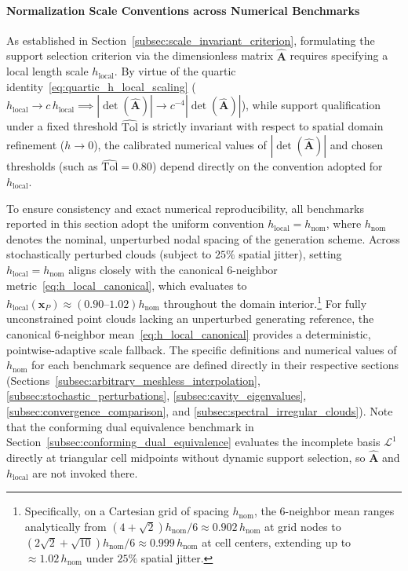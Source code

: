 \documentclass[preprint,12pt]{elsarticle}
\begin{document}
\paragraph{Normalization Scale Conventions across Numerical Benchmarks}
As established in Section~\ref{subsec:scale_invariant_criterion}, formulating the support selection criterion via the dimensionless matrix $\widehat{\mathbf{A}}$ requires specifying a local length scale $h_{\mathrm{local}}$. By virtue of the quartic identity~\eqref{eq:quartic_h_local_scaling} ($h_{\mathrm{local}} \to c \, h_{\mathrm{local}} \implies |\det(\widehat{\mathbf{A}})| \to c^{-4} |\det(\widehat{\mathbf{A}})|$), while support qualification under a fixed threshold $\widehat{\mathrm{Tol}}$ is strictly invariant with respect to spatial domain refinement ($h \to 0$), the calibrated numerical values of $|\det(\widehat{\mathbf{A}})|$ and chosen thresholds (such as $\widehat{\mathrm{Tol}} = 0.80$) depend directly on the convention adopted for $h_{\mathrm{local}}$.

To ensure consistency and exact numerical reproducibility, all benchmarks reported in this section adopt the uniform convention $h_{\mathrm{local}} = h_{\mathrm{nom}}$, where $h_{\mathrm{nom}}$ denotes the nominal, unperturbed nodal spacing of the generation scheme. Across stochastically perturbed clouds (subject to $25\%$ spatial jitter), setting $h_{\mathrm{local}} = h_{\mathrm{nom}}$ aligns closely with the canonical 6-neighbor metric~\eqref{eq:h_local_canonical}, which evaluates to $h_{\mathrm{local}}(\mathbf{x}_P) \approx (0.90\text{--}1.02) h_{\mathrm{nom}}$ throughout the domain interior.\footnote{Specifically, on a Cartesian grid of spacing $h_{\mathrm{nom}}$, the 6-neighbor mean ranges analytically from $(4 + \sqrt{2})h_{\mathrm{nom}}/6 \approx 0.902\,h_{\mathrm{nom}}$ at grid nodes to $(2\sqrt{2} + \sqrt{10})h_{\mathrm{nom}}/6 \approx 0.999\,h_{\mathrm{nom}}$ at cell centers, extending up to $\approx 1.02\,h_{\mathrm{nom}}$ under $25\%$ spatial jitter.} For fully unconstrained point clouds lacking an unperturbed generating reference, the canonical 6-neighbor mean~\eqref{eq:h_local_canonical} provides a deterministic, pointwise-adaptive scale fallback. The specific definitions and numerical values of $h_{\mathrm{nom}}$ for each benchmark sequence are defined directly in their respective sections (Sections~\ref{subsec:arbitrary_meshless_interpolation}, \ref{subsec:stochastic_perturbations}, \ref{subsec:cavity_eigenvalues}, \ref{subsec:convergence_comparison}, and \ref{subsec:spectral_irregular_clouds}). Note that the conforming dual equivalence benchmark in Section~\ref{subsec:conforming_dual_equivalence} evaluates the incomplete basis $\mathcal{L}^1$ directly at triangular cell midpoints without dynamic support selection, so $\widehat{\mathbf{A}}$ and $h_{\mathrm{local}}$ are not invoked there.
\end{document}
